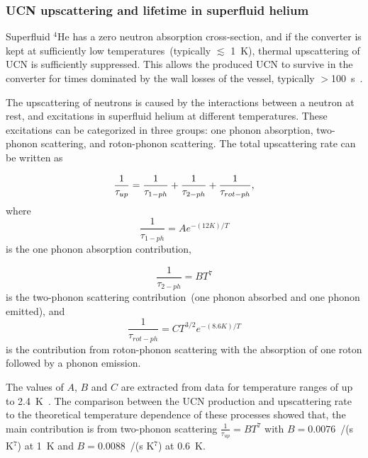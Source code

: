 \subsubsection{UCN upscattering and lifetime in superfluid
  helium~\label{sec:upscattering}}



Superfluid $^4$He has a zero neutron absorption cross-section, and if
the converter is kept at sufficiently low temperatures~(typically
$\lesssim$ 1~K), thermal upscattering of UCN is sufficiently
suppressed. This allows the produced UCN to survive in the converter
for times dominated by the wall losses of the vessel, typically
$>$100~s~\cite{Leung2016}.

The upscattering of neutrons is caused by the interactions between a
neutron at rest, and excitations in superfluid helium at different
temperatures. These excitations can be categorized in three groups:
one phonon absorption, two-phonon scattering, and roton-phonon
scattering. The total upscattering rate can be written as

\begin{equation}
\label{eqn:hE_{UCN}pscattering}
\frac{1}{\tau_{up}} =
\frac{1}{\tau_{1-ph}}+\frac{1}{\tau_{2-ph}}+\frac{1}{\tau_{rot-ph}},
\end{equation}
where 
\begin{equation}
\label{eqn:1ph}
\frac{1}{\tau_{1-ph}}= A e^{-(12 K)/T}
\end{equation}
is the one phonon absorption contribution, 

\begin{equation}
\label{eqn:2ph}
\frac{1}{\tau_{2-ph}}= BT^7
\end{equation}
is the two-phonon scattering contribution~(one phonon absorbed and one
phonon emitted), and
\begin{equation}
\label{eqn:ph-rtn}
\frac{1}{\tau_{rot-ph}}= CT^{3/2}e^{-(8.6 K)/T}
\end{equation}
is the contribution from roton-phonon scattering with the absorption
of one roton followed by a phonon emission.

The values of $A$, $B$ and $C$ are extracted from data for temperature
ranges of up to 2.4~K~\cite{Leung2016}. The comparison between the UCN
production and upscattering rate to the theoretical temperature
dependence of these processes showed that, the main contribution is
from two-phonon scattering $\frac{1}{\tau_{up}}=BT^7$ with
$B = 0.0076$~/(s K$^7$) at 1~K and $B = 0.0088$~/(s K$^7$) at
0.6~K\cite{Leung2016}.


